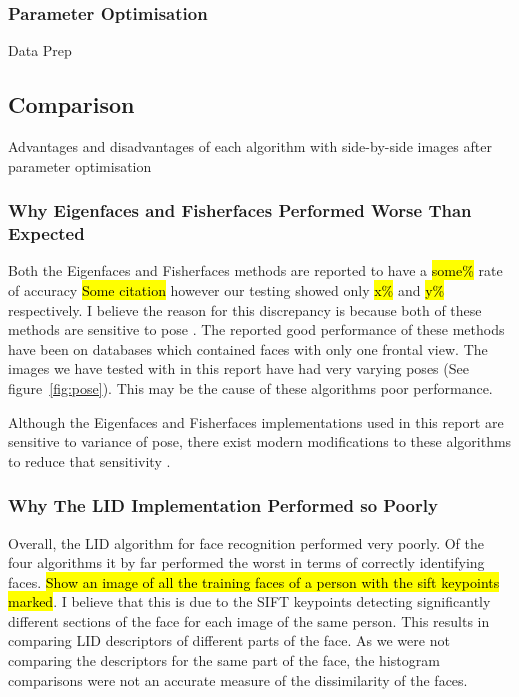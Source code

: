\documentclass{article}
\begin{document}
\subsubsection{Parameter Optimisation}
Data Prep

\subsection{Comparison}
Advantages and disadvantages of each algorithm with side-by-side images after parameter optimisation

\subsubsection{Why Eigenfaces and Fisherfaces Performed Worse Than Expected}
Both the Eigenfaces and Fisherfaces methods are reported to have a \hl{some\%} rate of accuracy \hl{Some citation} however our testing showed only \hl{x\%} and \hl{y\%} respectively. I believe the reason for this discrepancy is because both of these methods are sensitive to pose \cite{turk1991eigenfaces}\cite{belhumeur1997eigenfaces}. The reported good performance of these methods have been on databases which contained faces with only one frontal view. The images we have tested with in this report have had very varying poses (See figure~\ref{fig:pose}). This may be the cause of these algorithms poor performance.

Although the Eigenfaces and Fisherfaces implementations used in this report are sensitive to variance of pose, there exist modern modifications to these algorithms to reduce that sensitivity \cite{jaiswal2012local}.

\subsubsection{Why The LID Implementation Performed so Poorly}
Overall, the LID algorithm for face recognition performed very poorly. Of the four algorithms it by far performed the worst in terms of correctly identifying faces. \hl{Show an image of all the training faces of a person with the sift keypoints marked}. I believe that this is due to the SIFT keypoints detecting significantly different sections of the face for each image of the same person. This results in comparing LID descriptors of different parts of the face. As we were not comparing the descriptors for the same part of the face, the histogram comparisons were not an accurate measure of the dissimilarity of the faces.
\end{document}
